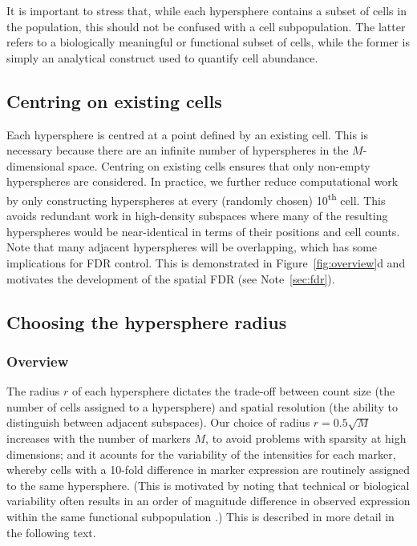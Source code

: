 \documentclass{article}
\begin{document}
It is important to stress that, while each hypersphere contains a subset of cells in the population, this should not be confused with a cell subpopulation.
The latter refers to a biologically meaningful or functional subset of cells, while the former is simply an analytical construct used to quantify cell abundance.

\subsection{Centring on existing cells}
Each hypersphere is centred at a point defined by an existing cell.
This is necessary because there are an infinite number of hyperspheres in the $M$-dimensional space.
Centring on existing cells ensures that only non-empty hyperspheres are considered.
In practice, we further reduce computational work by only constructing hyperspheres at every (randomly chosen) 10\textsuperscript{th} cell.
This avoids redundant work in high-density subspaces where many of the resulting hyperspheres would be near-identical in terms of their positions and cell counts.
Note that many adjacent hyperspheres will be overlapping, which has some implications for FDR control.
This is demonstrated in Figure~\ref{fig:overview}d and motivates the development of the spatial FDR (see Note~\ref{sec:fdr}).

\subsection{Choosing the hypersphere radius}

\subsubsection{Overview}
The radius $r$ of each hypersphere dictates the trade-off between count size (the number of cells assigned to a hypersphere) and spatial resolution (the ability to distinguish between adjacent subspaces).
Our choice of radius $r=0.5\sqrt{M}$ increases with the number of markers $M$, to avoid problems with sparsity at high dimensions; and it acounts for the variability of the intensities for each marker, whereby cells with a 10-fold difference in marker expression are routinely assigned to the same hypersphere.
(This is motivated by noting that technical or biological variability often results in an order of magnitude difference in observed expression within the same functional subpopulation \cite{zunder2015palladium, ornatsky2008study,zunder2015continuous}.)
This is described in more detail in the following text.
\end{document}
